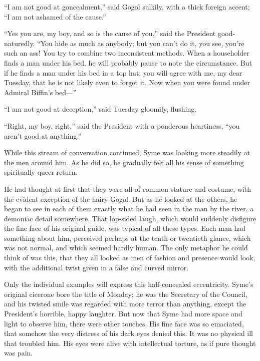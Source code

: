\documentclass{book}
\begin{document}
“I am not good at goncealment,” said Gogol sulkily, with a thick foreign accent; “I am not ashamed of the cause.”

“Yes you are, my boy, and so is the cause of you,” said the President good-naturedly. “You hide as much as anybody; but you can’t do it, you see, you’re such an ass! You try to combine two inconsistent methods. When a householder finds a man under his bed, he will probably pause to note the circumstance. But if he finds a man under his bed in a top hat, you will agree with me, my dear Tuesday, that he is not likely even to forget it. Now when you were found under Admiral Biffin’s bed—”

“I am not good at deception,” said Tuesday gloomily, flushing.

“Right, my boy, right,” said the President with a ponderous heartiness, “you aren’t good at anything.”

While this stream of conversation continued, Syme was looking more steadily at the men around him. As he did so, he gradually felt all his sense of something spiritually queer return.

He had thought at first that they were all of common stature and costume, with the evident exception of the hairy Gogol. But as he looked at the others, he began to see in each of them exactly what he had seen in the man by the river, a demoniac detail somewhere. That lop-sided laugh, which would suddenly disfigure the fine face of his original guide, was typical of all these types. Each man had something about him, perceived perhaps at the tenth or twentieth glance, which was not normal, and which seemed hardly human. The only metaphor he could think of was this, that they all looked as men of fashion and presence would look, with the additional twist given in a false and curved mirror.

Only the individual examples will express this half-concealed eccentricity. Syme’s original cicerone bore the title of Monday; he was the Secretary of the Council, and his twisted smile was regarded with more terror than anything, except the President’s horrible, happy laughter. But now that Syme had more space and light to observe him, there were other touches. His fine face was so emaciated, that somehow the very distress of his dark eyes denied this. It was no physical ill that troubled him. His eyes were alive with intellectual torture, as if pure thought was pain.
\end{document}
